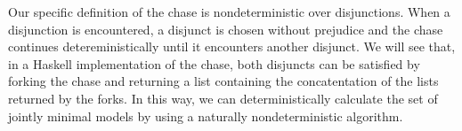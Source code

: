 		Our specific definition of the chase is nondeterministic over
		disjunctions.  When a disjunction is encountered, a disjunct is chosen
		without prejudice and the chase continues detereministically until it
		encounters another disjunct. We will see that, in a Haskell
		implementation of the chase, both disjuncts can be satisfied by forking
		the chase and returning a list containing the concatentation of the
		lists returned by the forks. In this way, we can deterministically
		calculate the set of jointly minimal models by using a naturally
		nondeterministic algorithm.
